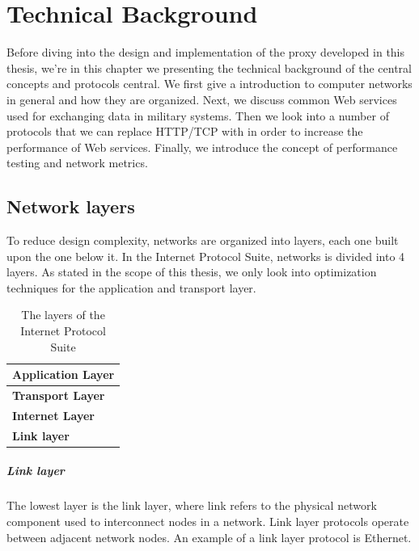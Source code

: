 \chapter{Technical Background}

Before diving into the design and implementation of the proxy developed in this
thesis, we're in this chapter we presenting the technical background of the
central concepts and protocols central. We first give a introduction to computer
networks in general and how they are organized. Next, we discuss common Web
services used for exchanging data in military systems. Then we look into a
number of protocols that we can replace HTTP/TCP with in order to increase the
performance of Web services. Finally, we introduce the concept of performance
testing and network metrics.

\section{Network layers}

To reduce design complexity, networks are organized into layers, each one built
upon the one below it. In the Internet Protocol Suite\cite{rfc-1122}, networks
is divided into 4 layers. As stated in the scope of this thesis, we only look
into optimization techniques for the application and transport layer.

\begin{table}[h]
\begin{tabularx}{\textwidth}{| X |}
\hline
  \textbf{Application Layer} \\ \hline
  \textbf{Transport Layer} \\ \hline
  \textbf{Internet Layer} \\ \hline
  \textbf{Link layer} \\ \hline
\end{tabularx}
\caption{The layers of the Internet Protocol Suite}
\label{figure-network-layers}
\end{table}

\paragraph{Link layer}

The lowest layer is the link layer, where link refers to the physical
network component used to interconnect nodes in a network. Link layer protocols
operate between adjacent network nodes. An example of a link layer protocol is
Ethernet.

